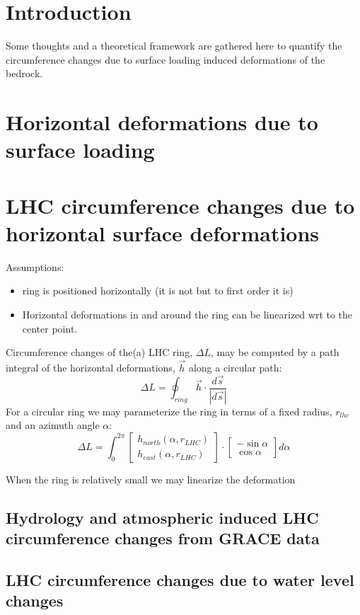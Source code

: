 \documentclass[a4paper,10pt,twoside,openany]{report}
\title{\ititle}
\author{\iauthor}
\begin{document}
\maketitle

\section{Introduction}
Some thoughts and a theoretical framework are gathered here to
quantify the circumference changes due to surface loading induced
deformations of the bedrock.

\section{Horizontal deformations due to surface loading}
\section{LHC circumference changes due to horizontal surface
  deformations}
Assumptions:
\begin{itemize}
\item ring is positioned horizontally (it is not but to first order it
  is)
  \item Horizontal deformations in and around the ring can be
    linearized wrt to the center point.
\end{itemize}
Circumference changes of the(a) LHC ring,  $\Delta L$, may be computed by a path
integral of the horizontal deformations, $\vec{h}$ along a circular path: 
\begin{equation}
  \Delta L =\oint_{ring} \vec{h} \cdot \frac{d\vec{s}}{|d\vec{s}|}
\end{equation}
For a circular ring we may parameterize the ring in terms of a fixed
radius, $r_{lhc}$ and an azimuth angle $\alpha$:
\begin{equation}
  \Delta L =\int_{0}^{2\pi}
  \left[\begin{array}{c}h_{north}(\alpha,r_{LHC})\\h_{east}(\alpha,r_{LHC})\end{array}\right]
  \cdot \left[\begin{array}{c}-\sin \alpha\\\cos \alpha\end{array}\right]d\alpha
\end{equation}


When the  ring is relatively small we may linearize the deformation
\subsection{Hydrology and atmospheric induced LHC circumference changes from GRACE data}
\subsection{LHC circumference changes due to water level changes}



%
%
\end{document}
